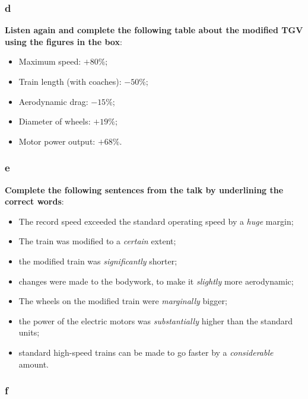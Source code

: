 \subsubsection{d}

\textbf{Listen again and complete the following table about the modified TGV using the figures in the box}:

\begin{itemize}

\item Maximum speed: $+80\%$;
\item Train length (with coaches): $-50\%$;
\item Aerodynamic drag: $-15\%$;
\item Diameter of wheels: $+19\%$;
\item Motor power output: $+68\%$.

\end{itemize}

\subsubsection{e}

\textbf{Complete the following sentences from the talk by underlining the correct words}:

\begin{itemize}

\item The record speed exceeded the standard operating speed by a \textit{huge} margin;
\item The train was modified to a \textit{certain} extent;
\item the modified train was \textit{significantly} shorter;
\item changes were made to the bodywork, to make it \textit{slightly} more aerodynamic;
\item The wheels on the modified train were \textit{marginally} bigger;
\item the power of the electric motors was \textit{substantially} higher than the standard units;
\item standard high-speed trains can be made to go faster by a \textit{considerable} amount.

\end{itemize}

\subsubsection{f}

